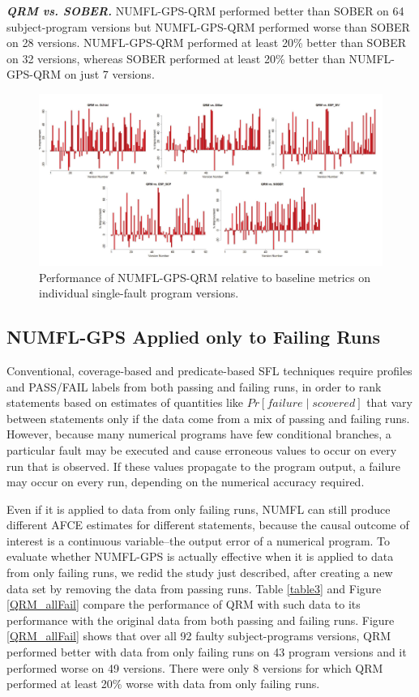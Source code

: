 \textit{\textbf{ QRM vs. SOBER.}}  NUMFL-GPS-QRM performed better than SOBER on 64 subject-program versions but NUMFL-GPS-QRM performed worse than SOBER on 28 versions.  NUMFL-GPS-QRM performed at least 20\% better than SOBER on 32 versions, whereas SOBER performed at least 20\% better than NUMFL-GPS-QRM on just 7 versions.

\begin{figure}
\centering
\includegraphics[width=\textwidth]{chapter3_QRM_VS_Base.pdf}
\caption{Performance of NUMFL-GPS-QRM relative to baseline metrics on individual single-fault program versions.}
\label{QRM_VS_Base}
\end{figure}

\subsection{NUMFL-GPS Applied only to Failing Runs}\label{VE}
Conventional, coverage-based and predicate-based SFL techniques require profiles and PASS/FAIL labels from both passing and failing runs, in order to rank statements based on estimates of quantities like $Pr [failure \mid s covered]$ \cite{baah2010causal} that vary between statements only if the data come from a mix of passing and failing runs.  However, because many numerical programs have few conditional branches, a particular fault may be executed and cause erroneous values to occur on every run that is observed.  If these values propagate to the program output, a failure may occur on every run, depending on the numerical accuracy required.


Even if it is applied to data from only failing runs, NUMFL can still produce different AFCE estimates for different statements, because the causal outcome of interest is a continuous variable--the output error of a numerical program.  To evaluate whether NUMFL-GPS is actually effective when it is applied to data from only failing runs, we redid the study just described, after creating a new data set by removing the data from passing runs.  Table \ref{table3} and Figure \ref{QRM_allFail} compare the performance of QRM with such data to its performance with the original data from both passing and failing runs.  Figure \ref{QRM_allFail} shows that over all 92 faulty subject-programs versions, QRM performed better with data from only failing runs on 43 program versions and it performed worse on 49 versions.  There were only 8 versions for which QRM performed at least 20\% worse with data from only failing runs.

